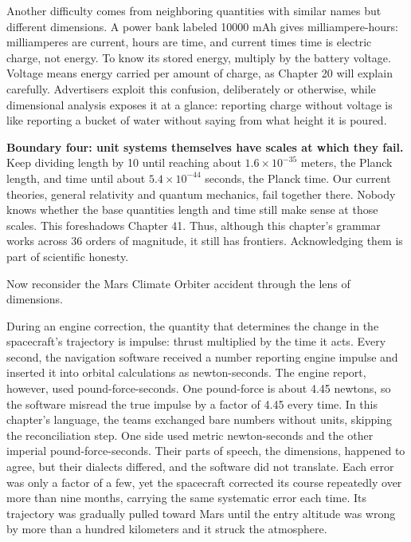 Another difficulty comes from neighboring quantities with similar names but different dimensions. A power bank labeled 10000 mAh gives milliampere-hours: milliamperes are current, hours are time, and current times time is electric charge, not energy. To know its stored energy, multiply by the battery voltage. Voltage means energy carried per amount of charge, as Chapter 20 will explain carefully. Advertisers exploit this confusion, deliberately or otherwise, while dimensional analysis exposes it at a glance: reporting charge without voltage is like reporting a bucket of water without saying from what height it is poured.

\textbf{Boundary four: unit systems themselves have scales at which they fail.} Keep dividing length by 10 until reaching about $1.6\times10^{-35}$ meters, the Planck length, and time until about $5.4\times10^{-44}$ seconds, the Planck time. Our current theories, general relativity and quantum mechanics, fail together there. Nobody knows whether the base quantities length and time still make sense at those scales. This foreshadows Chapter 41. Thus, although this chapter's grammar works across 36 orders of magnitude, it still has frontiers. Acknowledging them is part of scientific honesty.


Now reconsider the Mars Climate Orbiter accident through the lens of dimensions.

During an engine correction, the quantity that determines the change in the spacecraft's trajectory is impulse: thrust multiplied by the time it acts. Every second, the navigation software received a number reporting engine impulse and inserted it into orbital calculations as newton-seconds. The engine report, however, used pound-force-seconds. One pound-force is about 4.45 newtons, so the software misread the true impulse by a factor of 4.45 every time. In this chapter's language, the teams exchanged bare numbers without units, skipping the reconciliation step. One side used metric newton-seconds and the other imperial pound-force-seconds. Their parts of speech, the dimensions, happened to agree, but their dialects differed, and the software did not translate. Each error was only a factor of a few, yet the spacecraft corrected its course repeatedly over more than nine months, carrying the same systematic error each time. Its trajectory was gradually pulled toward Mars until the entry altitude was wrong by more than a hundred kilometers and it struck the atmosphere.

